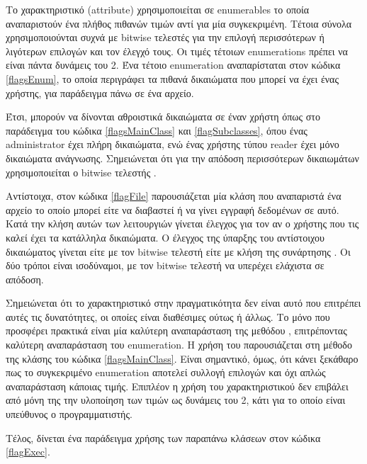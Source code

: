 Το χαρακτηριστικό (attribute) \codebox{[Flags]} χρησιμοποιείται σε enumerables το οποία αναπαριστούν ένα πλήθος πιθανών τιμών αντί για μία συγκεκριμένη. Τέτοια σύνολα χρησιμοποιούνται συχνά με bitwise τελεστές για την επιλογή περισσότερων ή λιγότερων επιλογών και τον έλεγχό τους. Οι τιμές τέτοιων enumerations πρέπει να είναι πάντα δυνάμεις του 2. Ένα τέτοιο enumeration αναπαρίσταται στον κώδικα \ref{flagsEnum}, το οποία περιγράφει τα πιθανά δικαιώματα που μπορεί να έχει ένας χρήστης, για παράδειγμα πάνω σε ένα αρχείο.



Έτσι, μπορούν να δίνονται αθροιστικά δικαιώματα σε έναν χρήστη όπως στο παράδειγμα του κώδικα \ref{flagsMainClass} και \ref{flagSubclasses}, όπου ένας administrator έχει πλήρη δικαιώματα, ενώ ένας χρήστης τύπου reader έχει μόνο δικαιώματα ανάγνωσης. Σημειώνεται ότι για την απόδοση περισσότερων δικαιωμάτων χρησιμοποιείται ο bitwise τελεστής \codebox{|}.

Αντίστοιχα, στον κώδικα \ref{flagFile} παρουσιάζεται μία κλάση που αναπαριστά ένα αρχείο το οποίο μπορεί είτε να διαβαστεί ή να γίνει εγγραφή δεδομένων σε αυτό. Κατά την κλήση αυτών των λειτουργιών γίνεται έλεγχος για τον αν ο χρήστης που τις καλεί έχει τα κατάλληλα δικαιώματα. Ο έλεγχος της ύπαρξης του αντίστοιχου δικαιώματος γίνεται είτε με τον bitwise τελεστή \codebox{&} είτε με κλήση της συνάρτησης . Οι δύο τρόποι είναι ισοδύναμοι, με τον bitwise τελεστή να υπερέχει ελάχιστα σε απόδοση.





Σημειώνεται ότι το χαρακτηριστικό \codebox{[Flags]} στην πραγματικότητα δεν είναι αυτό που επιτρέπει αυτές τις δυνατότητες, οι οποίες είναι διαθέσιμες ούτως ή άλλως. Το μόνο που προσφέρει πρακτικά είναι μία καλύτερη αναπαράσταση της μεθόδου , επιτρέποντας καλύτερη αναπαράσταση του enumeration. Η χρήση του παρουσιάζεται στη μέθοδο  της κλάσης του κώδικα \ref{flagsMainClass}. Είναι σημαντικό, όμως, ότι κάνει ξεκάθαρο πως το συγκεκριμένο enumeration αποτελεί συλλογή επιλογών και όχι απλώς αναπαράσταση κάποιας τιμής. Επιπλέον η χρήση του χαρακτηριστικού δεν επιβάλει από μόνη της την υλοποίηση των τιμών ως δυνάμεις του 2, κάτι για το οποίο είναι υπεύθυνος ο προγραμματιστής.

Τέλος, δίνεται ένα παράδειγμα χρήσης των παραπάνω κλάσεων στον κώδικα \ref{flagExec}.


